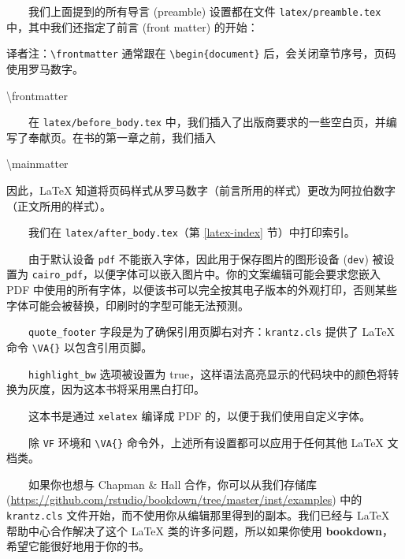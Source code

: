 \documentclass[
  12pt,
]{krantz}
\newenvironment{Shaded}{\begin{snugshade}}{\end{snugshade}}
\newcommand{\FunctionTok}[1]{\textcolor[rgb]{0.00,0.00,0.00}{#1}}
\renewenvironment{quote}{\begin{VF}}{\end{VF}}
\theoremstyle{definition}
\theoremstyle{definition}
\theoremstyle{definition}
\theoremstyle{definition}
\theoremstyle{remark}
\begin{document}
  我们上面提到的所有导言 (preamble) 设置都在文件 \texttt{latex/preamble.tex} 中，其中我们还指定了前言 (front matter) 的开始：

\begin{quote}
译者注：\texttt{\textbackslash{}frontmatter} 通常跟在 \texttt{\textbackslash{}begin\{document\}} 后，会关闭章节序号，页码使用罗马数字。
\end{quote}

\begin{Shaded}
\begin{Highlighting}[]
\FunctionTok{\textbackslash{}frontmatter}
\end{Highlighting}
\end{Shaded}

  在 \texttt{latex/before\_body.tex} 中，我们插入了出版商要求的一些空白页，并编写了奉献页。在书的第一章之前，我们插入

\begin{Shaded}
\begin{Highlighting}[]
\FunctionTok{\textbackslash{}mainmatter}
\end{Highlighting}
\end{Shaded}

因此，LaTeX 知道将页码样式从罗马数字（前言所用的样式）更改为阿拉伯数字（正文所用的样式）。

  我们在 \texttt{latex/after\_body.tex}（第 \ref{latex-index} 节）中打印索引。

  由于默认设备 \texttt{pdf} 不能嵌入字体，因此用于保存图片的图形设备 (\texttt{dev}) 被设置为 \texttt{cairo\_pdf}，以便字体可以嵌入图片中。你的文案编辑可能会要求您嵌入 PDF 中使用的所有字体，以便该书可以完全按其电子版本的外观打印，否则某些字体可能会被替换，印刷时的字型可能无法预测。

  \texttt{quote\_footer} 字段是为了确保引用页脚右对齐：\texttt{krantz.cls} 提供了 LaTeX 命令 \texttt{\textbackslash{}VA\{\}} 以包含引用页脚。

  \texttt{highlight\_bw} 选项被设置为 true，这样语法高亮显示的代码块中的颜色将转换为灰度，因为这本书将采用黑白打印。

  这本书是通过 \texttt{xelatex} 编译成 PDF 的，以便于我们使用自定义字体。

  除 \texttt{VF} 环境和 \texttt{\textbackslash{}VA\{\}} 命令外，上述所有设置都可以应用于任何其他 LaTeX 文档类。

  如果你也想与 Chapman \& Hall 合作，你可以从我们存储库 (\url{https://github.com/rstudio/bookdown/tree/master/inst/examples}) 中的 \texttt{krantz.cls} 文件开始，而不使用你从编辑那里得到的副本。我们已经与 LaTeX 帮助中心合作解决了这个 LaTeX 类的许多问题，所以如果你使用 \textbf{bookdown}，希望它能很好地用于你的书。
\end{document}
